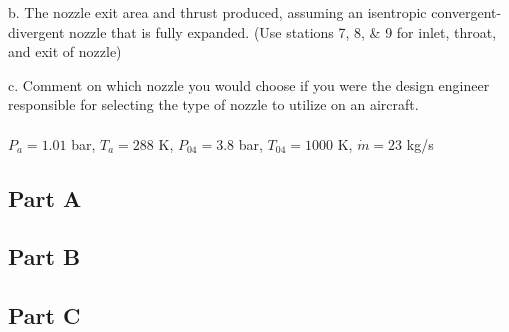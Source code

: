 \documentclass{article}
\begin{document}
b. The nozzle exit area and thrust produced, assuming an isentropic convergent-
divergent nozzle that is fully expanded. (Use stations 7, 8, \& 9 for inlet, throat, and
exit of nozzle)

c. Comment on which nozzle you would choose if you were the design engineer
responsible for selecting the type of nozzle to utilize on an aircraft. \\\\
$P_a=1.01$ bar, $T_a=288$ K, $P_{04}=3.8$ bar, $T_{04}=1000$ K, $\dot{m}=23$ kg/s

\subsection*{Part A}

\subsection*{Part B}

\subsection*{Part C}
\end{document}
